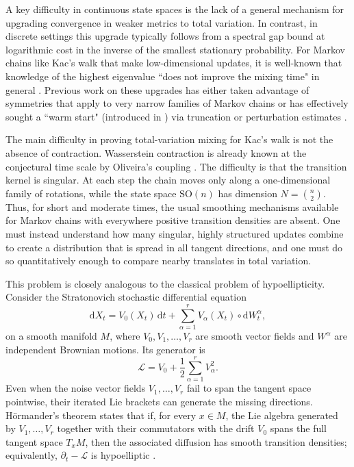 \documentclass[11pt, reqno]{amsart}
\numberwithin{equation}{section}
\theoremstyle{remark}
\newcommand{\1}{\mathbf{1}}
\newcommand{\SO}{\mathrm{SO}}
\newcommand{\dd}{\mathrm{d}}
\begin{document}
A key difficulty in continuous state spaces is the lack of a general mechanism for upgrading convergence in weaker metrics to total variation. In contrast, in discrete settings this upgrade typically follows from a spectral gap bound at logarithmic cost in the inverse of the smallest stationary probability. For Markov chains like Kac's walk that make low-dimensional updates, it is well-known that knowledge of the highest eigenvalue ``does not improve the mixing time" in general \cite{PakSidenko}. Previous work on these upgrades has either taken advantage of symmetries that apply to very narrow families of Markov chains \cite{Rosenthal,Porod,HoughJiang} or has effectively sought a ``warm start" (introduced in \cite{LovaszSimonovits1993RandomWalksConvexBody}) via truncation or perturbation estimates \cite{JiangSO,PillaiSmith}.

The main difficulty in proving total-variation mixing for Kac's walk is not the absence of
contraction.  Wasserstein contraction is already known at the conjectural time scale by
Oliveira's coupling \cite{Oliveira}.  The difficulty is that the transition kernel is singular.
At each step the chain moves only along a one-dimensional family of rotations, while the
state space $\SO(n)$ has dimension $N=\binom n2$.  Thus, for short and moderate times,
the usual smoothing mechanisms available for Markov chains with everywhere positive
transition densities are absent.  One must instead understand how many singular, highly
structured updates combine to create a distribution that is spread in all tangent directions,
and one must do so quantitatively enough to compare nearby translates in total variation.

This problem is closely analogous to the classical problem of hypoellipticity.
Consider the Stratonovich stochastic differential equation
\begin{equation}
\label{eq:classical-hypoelliptic-sde}
    \dd X_t
    =
    V_0(X_t)\,\dd t
    +
    \sum_{\alpha=1}^r V_\alpha(X_t)\circ \dd W_t^\alpha ,
\end{equation}
on a smooth manifold \(M\), where \(V_0,V_1,\ldots,V_r\) are smooth vector
fields and \(W^\alpha\) are independent Brownian motions. Its generator is
\[
    \mathcal L
    =
    V_0+\frac12\sum_{\alpha=1}^r V_\alpha^2.
\]
Even when the noise vector fields $V_1,\ldots,V_r$ fail to span the tangent space pointwise, their iterated Lie brackets can generate the missing directions. Hörmander’s theorem states that if, for every $x \in M$, the Lie algebra generated by $V_1,\ldots,V_r$ together with their commutators with the drift $V_0$ spans the full tangent space $T_xM$, then the associated diffusion has smooth transition densities; equivalently, $\partial_t - \mathcal{L}$ is hypoelliptic \cite{Hormander1967,Hairer2011Hormander}.
\end{document}
